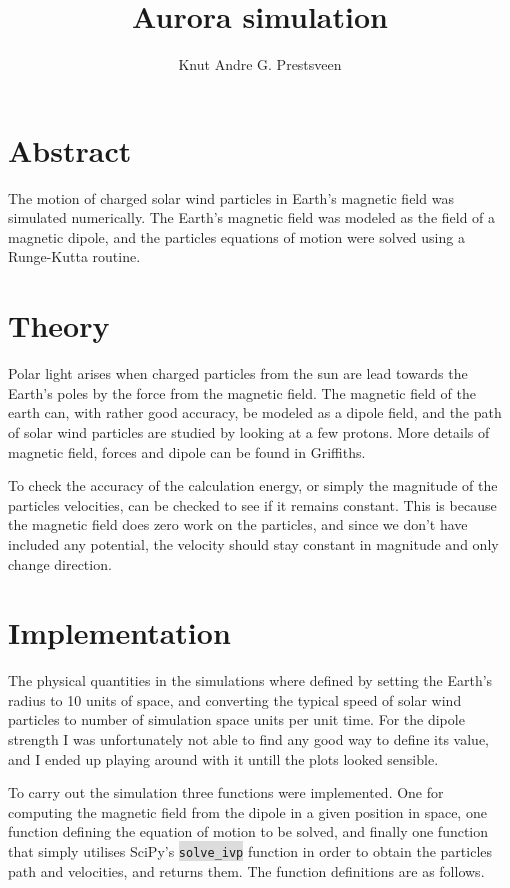 \documentclass{article}
\title{Aurora simulation}
\author{Knut Andre G. Prestsveen}
\begin{document}
\maketitle
\section{Abstract}
The motion of charged solar wind particles in Earth's magnetic field was simulated numerically. The Earth's magnetic field was modeled as the field of a magnetic dipole, and the particles equations of motion were solved using a Runge-Kutta routine.

\section{Theory}
\label{theory}
Polar light arises when charged particles from the sun are lead towards the Earth's poles by the force from the magnetic field. The magnetic field of the earth can, with rather good accuracy, be modeled as a dipole field, and the path of solar wind particles are studied by looking at a few protons. More details of magnetic field, forces and dipole can be found in Griffiths\cite{griffiths}.

To check the accuracy of the calculation energy, or simply the magnitude of the particles velocities, can be checked to see if it remains constant. This is because the magnetic field does zero work on the particles, and since we don't have included any potential, the velocity should stay constant in magnitude and only change direction.

\section{Implementation}
The physical quantities in the simulations where defined by setting the Earth's radius to 10 units of space, and converting the typical speed of solar wind particles to number of simulation space units per unit time. For the dipole strength I was unfortunately not able to find any good way to define its value, and I ended up playing around with it untill the plots looked sensible.

To carry out the simulation three functions were implemented. One for computing the magnetic field from the dipole in a given position in space, one function defining the equation of motion to be solved, and finally one function that simply utilises SciPy's \colorbox{gainsboro}{\lstinline{solve_ivp}} function in order to obtain the particles path and velocities, and returns them. The function definitions are as follows.
\end{document}
